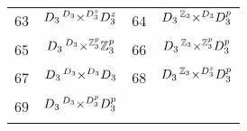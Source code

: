 \documentclass[11pt]{article}
\newcommand{\amal}[5]{#1\prescript{#2}{}{\underset{#3}{\times}}^{#4}#5}
\begin{document}
\begin{table}
\begin{tabularx}{.6\textwidth}{@{}|c|C||c|C|@{}}
      $63$ & $\amal{D_3}{D_3}{}{D_3^z}{D_3^z}$ & $64$ & $\amal{D_3}{\mathbb{Z}_3}{}{D_3}{D_3^p}$ \\
      $65$ & $\amal{D_3}{D_3}{}{\mathbb{Z}_3^p}{\mathbb{Z}_3^p}$ & $66$ & $\amal{D_3}{\mathbb{Z}_3}{}{\mathbb{Z}_3^p}{D_3^p}$ \\
      $67$ & $\amal{D_3}{D_3}{}{D_3}{D_3}$ & $68$ & $\amal{D_3}{\mathbb{Z}_3}{}{D_3^z}{D_3^p}$ \\
      $69$ & $\amal{D_3}{D_3}{}{D_3^p}{D_3^p}$ & & \\
      \bottomrule
    \end{tabularx}
  \end{table}
  
\end{document}
